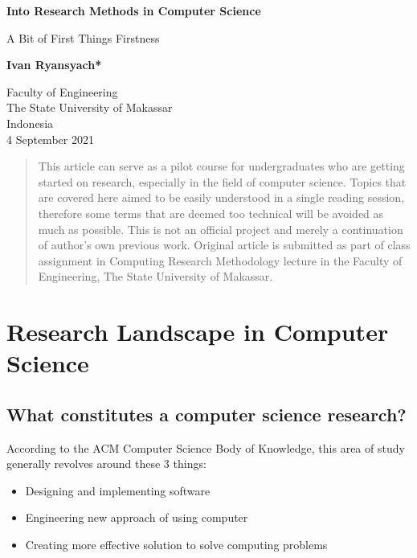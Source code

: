 \documentclass[a4paper,12pt]{article}
\begin{document}
    \begin{titlepage}
        \begin{center}
            \vspace*{1cm}

            \textbf{Into Research Methods in Computer Science}

            \vspace{0.5cm}
                A Bit of First Things Firstness
                    
            \vspace{1.5cm}

            \textbf{Ivan Ryansyach*}

            \vfill
                    
            \vspace{0.8cm}
            
            Faculty of Engineering\\
            The State University of Makassar\\
            Indonesia\\
            4 September 2021
                    
        \end{center}
    \end{titlepage}

    \newpage
    \begin{abstract}
        This article can serve as a pilot course for undergraduates who are getting started on research, especially in the field of computer science. Topics that are covered here aimed to be easily understood in a single reading session, therefore some terms that are deemed too technical will be avoided as much as possible. This is not an official project and merely a continuation of author's own previous work. Original article is submitted as part of class assignment in Computing Research Methodology lecture in the Faculty of Engineering, The State University of Makassar.
    \end{abstract}

    \newpage
    \tableofcontents

    \newpage
    \section{Research Landscape in Computer Science}
        \subsection{What constitutes a computer science research?}
            According to the ACM Computer Science Body of Knowledge, this area of study generally revolves around these 3 things:
            \begin{itemize}
                \item Designing and implementing software
                \item Engineering new approach of using computer
                \item Creating more effective solution to solve computing problems
            \end{itemize}
\end{document}
